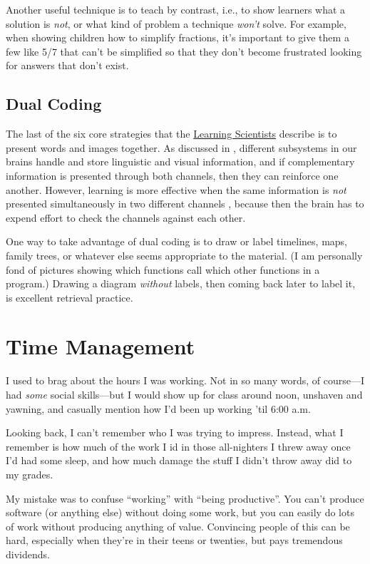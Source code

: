 Another useful technique is to teach by contrast, i.e., to show
learners what a solution is \emph{not}, or what kind of problem a
technique \emph{won't} solve.  For example, when showing children how
to simplify fractions, it's important to give them a few like 5/7 that
can't be simplified so that they don't become frustrated looking for
answers that don't exist.

\subsection*{Dual Coding}

The last of the six core strategies that the
\href{http://www.learningscientists.org/}{Learning Scientists}
describe is to present words and images together.  As discussed in
, different subsystems in our brains
handle and store linguistic and visual information, and if
complementary information is presented through both channels, then
they can reinforce one another.  However, learning is more effective
when the same information is \emph{not} presented simultaneously in
two different channels \cite{Maye2003}, because then the brain has to
expend effort to check the channels against each other.

One way to take advantage of dual coding is to draw or label
timelines, maps, family trees, or whatever else seems appropriate to
the material.  (I am personally fond of pictures showing which
functions call which other functions in a program.)  Drawing a diagram
\emph{without} labels, then coming back later to label it, is
excellent retrieval practice.

\section{Time Management}\label{s:individual-time}

I used to brag about the hours I was working.  Not in so many words,
of course---I had \emph{some} social skills---but I would show up for
class around noon, unshaven and yawning, and casually mention how I'd
been up working 'til 6:00 a.m.

Looking back, I can't remember who I was trying to impress.  Instead,
what I remember is how much of the work I id in those all-nighters I
threw away once I'd had some sleep, and how much damage the stuff I
didn't throw away did to my grades.

My mistake was to confuse ``working'' with ``being productive''.  You
can't produce software (or anything else) without doing some work, but
you can easily do lots of work without producing anything of value.
Convincing people of this can be hard, especially when they're in
their teens or twenties, but pays tremendous dividends.

